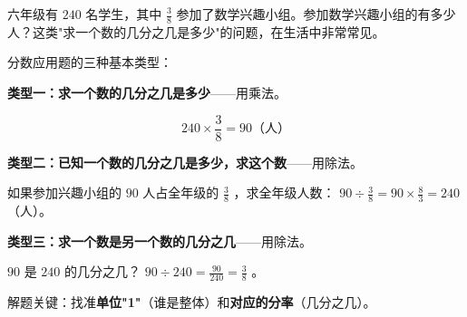 \begin{explore}


六年级有 $240$ 名学生，其中 $\frac{3}{8}$ 参加了数学兴趣小组。参加数学兴趣小组的有多少人？这类"求一个数的几分之几是多少"的问题，在生活中非常常见。

\end{explore}

\begin{understand}


分数应用题的三种基本类型：

\textbf{类型一：求一个数的几分之几是多少}——用乘法。

\[
240 \times \frac{3}{8} = 90 \text{（人）}
\]


\textbf{类型二：已知一个数的几分之几是多少，求这个数}——用除法。

如果参加兴趣小组的 $90$ 人占全年级的 $\frac{3}{8}$ ，求全年级人数： $90 \div \frac{3}{8} = 90 \times \frac{8}{3} = 240$ （人）。

\textbf{类型三：求一个数是另一个数的几分之几}——用除法。

$90$ 是 $240$ 的几分之几？ $90 \div 240 = \frac{90}{240} = \frac{3}{8}$ 。

解题关键：找准\textbf{单位"1"}（谁是整体）和\textbf{对应的分率}（几分之几）。

\end{understand}

